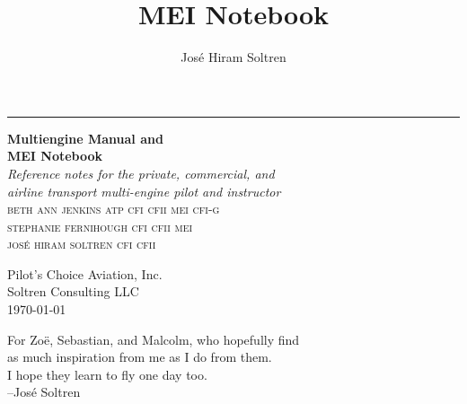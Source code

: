 \documentclass[11pt,twoside,letterpaper,onecolumn]{book}
\author{Jos\'e Hiram Soltren}
\title{MEI Notebook}
\newenvironment{dedication}
  {\clearpage           %
   \thispagestyle{empty}%
   \vspace*{\stretch{1}}%
   \itshape             %
   \raggedleft          %
  }
  {\par %
   \vspace{\stretch{3}} %
   \clearpage           %
  }
\begin{document}


\begin{titlepage} %

\raggedleft %
\rule{1pt}{\textheight} %
\hspace{0.05\textwidth} %
\parbox[b]{0.75\textwidth}{ %
{\Huge\bfseries Multiengine Manual and\\MEI Notebook}\\[2\baselineskip] %
{\large\textit{Reference notes for the private, commercial, and \\
    airline transport multi-engine pilot and instructor}}\\[4\baselineskip] %
{\Large\textsc{beth ann jenkins atp cfi cfii mei cfi-g\\}} %
{\Large\textsc{stephanie fernihough cfi cfii mei\\}} %
{\Large\textsc{jos\'e hiram soltren cfi cfii}} %

\vspace{0.5\textheight} %

{\noindent Pilot's Choice Aviation, Inc.\\Soltren Consulting LLC}\\[\baselineskip] %
{\noindent \today }\\[\baselineskip] %
}

\end{titlepage}

\begin{dedication}
For Zo\"e, Sebastian, and Malcolm, who hopefully find\\
as much inspiration from me as I do from them.\\
I hope they learn to fly one day too.\\
--Jos\'e Soltren
\end{dedication}
\end{document}

